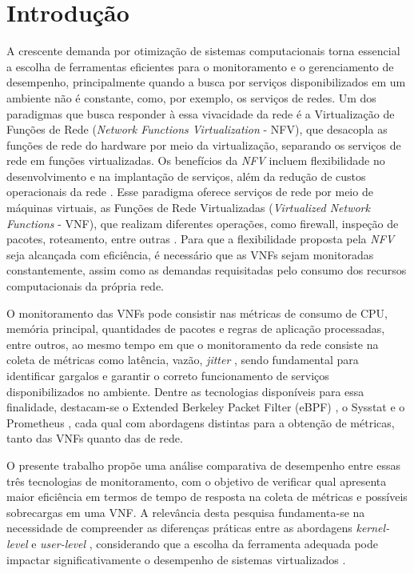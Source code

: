 \chapter{Introdução}

A crescente demanda por otimização de sistemas computacionais torna essencial a escolha de ferramentas eficientes para o monitoramento e o gerenciamento de desempenho, principalmente quando a busca por serviços disponibilizados em um ambiente não é constante, como, por exemplo, os serviços de redes. Um dos paradigmas que busca responder à essa vivacidade da rede \cite{oliveira2026-sbrc} é a Virtualização de Funções de Rede (\textit{Network Functions Virtualization} - NFV), que desacopla as funções de rede do hardware por meio da virtualização, separando os serviços de rede em funções virtualizadas. Os benefícios da \textit{NFV} incluem flexibilidade no desenvolvimento e na implantação de serviços, além da redução de custos operacionais da rede \cite{mijumbi2016}. Esse paradigma oferece serviços de rede por meio de máquinas virtuais, as Funções de Rede Virtualizadas (\textit{Virtualized Network Functions} - VNF), que realizam diferentes operações, como firewall, inspeção de pacotes, roteamento, entre outras \cite{10.1145/3172866}. Para que a flexibilidade proposta pela \textit{NFV} seja alcançada com eficiência, é necessário que as VNFs sejam monitoradas constantemente, assim como as demandas requisitadas pelo consumo dos recursos computacionais da própria rede.

O monitoramento das VNFs pode consistir nas métricas de consumo de CPU, memória principal, quantidades de pacotes e regras de aplicação processadas, entre outros, ao mesmo tempo em que o monitoramento da rede consiste na coleta de métricas como latência, vazão, \textit{jitter} \cite{rfc6390}, sendo fundamental para identificar gargalos e garantir o correto funcionamento de serviços disponibilizados no ambiente. Dentre as tecnologias disponíveis para essa finalidade, destacam-se o Extended Berkeley Packet Filter (eBPF) \cite{gregg_bpf_2019}, o Sysstat \cite{godard2024sysstat} e o Prometheus \cite{turnbull_prometheus_2018}, cada qual com abordagens distintas para a obtenção de métricas, tanto das VNFs quanto das de rede.

O presente trabalho propõe uma análise comparativa de desempenho entre essas três tecnologias de monitoramento, com o objetivo de verificar qual apresenta maior eficiência em termos de tempo de resposta na coleta de métricas e possíveis sobrecargas em uma VNF. A relevância desta pesquisa fundamenta-se na necessidade de compreender as diferenças práticas entre as abordagens \textit{kernel-level} e \textit{user-level} \cite{linux_bpf_docs}, considerando que a escolha da ferramenta adequada pode impactar significativamente o desempenho de sistemas virtualizados \cite{10.1145/3397022}.

